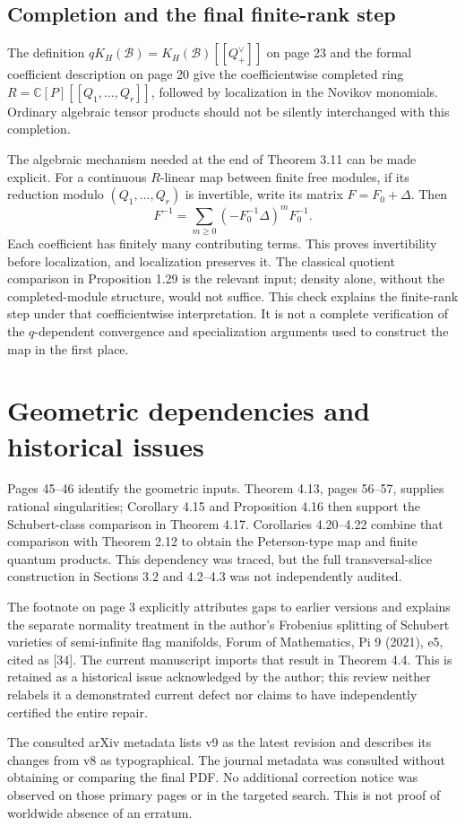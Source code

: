 \documentclass[10pt]{article}
\begin{document}
\subsection*{Completion and the final finite-rank step}
The definition \(qK_H(\mathcal B)=K_H(\mathcal B)[[Q^\vee_+]]\) on page 23 and the formal coefficient description on page 20 give the coefficientwise completed ring \(R=\mathbb C[P][[Q_1,\ldots,Q_r]]\), followed by localization in the Novikov monomials. Ordinary algebraic tensor products should not be silently interchanged with this completion.\par
The algebraic mechanism needed at the end of Theorem 3.11 can be made explicit. For a continuous \(R\)-linear map between finite free modules, if its reduction modulo \((Q_1,\ldots,Q_r)\) is invertible, write its matrix \(F=F_0+\Delta\). Then \[F^{-1}=\sum_{m\geq0}(-F_0^{-1}\Delta)^mF_0^{-1}.\] Each coefficient has finitely many contributing terms. This proves invertibility before localization, and localization preserves it. The classical quotient comparison in Proposition 1.29 is the relevant input; density alone, without the completed-module structure, would not suffice. This check explains the finite-rank step under that coefficientwise interpretation. It is not a complete verification of the \(q\)-dependent convergence and specialization arguments used to construct the map in the first place.\par
\section*{Geometric dependencies and historical issues}
Pages 45–46 identify the geometric inputs. Theorem 4.13, pages 56–57, supplies rational singularities; Corollary 4.15 and Proposition 4.16 then support the Schubert-class comparison in Theorem 4.17. Corollaries 4.20–4.22 combine that comparison with Theorem 2.12 to obtain the Peterson-type map and finite quantum products. This dependency was traced, but the full transversal-slice construction in Sections 3.2 and 4.2–4.3 was not independently audited.\par
The footnote on page 3 explicitly attributes gaps to earlier versions and explains the separate normality treatment in the author’s Frobenius splitting of Schubert varieties of semi-infinite flag manifolds, Forum of Mathematics, Pi 9 (2021), e5, cited as [34]. The current manuscript imports that result in Theorem 4.4. This is retained as a historical issue acknowledged by the author; this review neither relabels it a demonstrated current defect nor claims to have independently certified the entire repair.\par
The consulted arXiv metadata lists v9 as the latest revision and describes its changes from v8 as typographical. The journal metadata was consulted without obtaining or comparing the final PDF. No additional correction notice was observed on those primary pages or in the targeted search. This is not proof of worldwide absence of an erratum.\par
\end{document}
